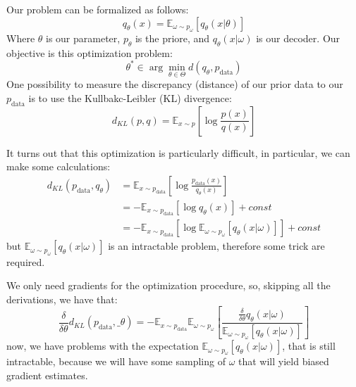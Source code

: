 Our problem can be formalized as follows: 
\begin{equation}
    q_\theta (x) = \mathbb{E}_{\omega \sim p_\omega} \left[ q_\theta (x | \theta) \right]
\end{equation}
Where \(\theta\) is our parameter, \(p_\theta\) is the priore, and \(q_\theta(x|\omega)\) is our decoder. Our objective is this optimization problem:
\begin{equation}
    \theta^* \in \arg \min_{\theta \in \Theta} d(q_\theta, p_\text{data})
\end{equation}
One possibility to measure the discrepancy (distance) of our prior data to our \(p_\text{data}\) is to use the Kullbakc-Leibler (KL) divergence:
\begin{equation}
    d_{KL}(p,q) = \mathbb{E}_{x \sim p} \left[ \log \frac {p(x)} {q(x)} \right]
\end{equation}

It turns out that this optimization is particularly difficult, in particular, we can make some calculations:
\begin{align}
    d_{KL} (p_\text{data}, q_\theta) &= \mathbb{E}_{x \sim p_\text{data}} \left[ \log \frac {p_\text{data}(x)} {q_\theta (x)} \right]\\
    &= - \mathbb{E}_{x \sim p_\text{data}} \left[ \log q_\theta(x) \right] + const\\
    &= - \mathbb{E}_{x \sim p_\text{data}} \left[ \log \mathbb{E}_{\omega \sim p_\omega} \left[ q_\theta(x | \omega) \right] \right] + const
\end{align}
but \( \mathbb{E}_{\omega \sim p_\omega} \left[ q_\theta (x | \omega) \right] \) is an intractable problem, therefore some trick are required.

We only need gradients for the optimization procedure, so, skipping all the derivations, we have that:
\begin{equation}
    \frac \delta {\delta \theta} d_{KL} (p_\text{data}, \_\theta) = - \mathbb{E}_{x \sim p_\text{data}} \mathbb{E}_{\omega \sim p_\omega} \left[ \frac {\frac \delta {\delta \theta} q_\theta (x | \omega)} { \mathbb{E}_{\omega \sim p_\omega} \left[ q_\theta (x | \omega) \right] } \right]
\end{equation}
now, we have problems with the expectation \( \mathbb{E}_{\omega \sim p_\omega} \left[ q_\theta (x | \omega) \right] \), that is still intractable, because we will have some sampling of \(\omega\) that will yield biased gradient estimates.

